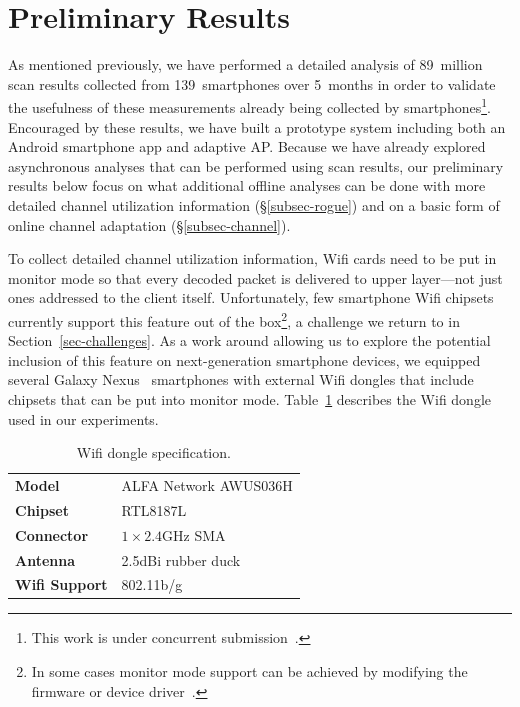 \section{Preliminary Results}
\label{sec-results}

As mentioned previously, we have performed a detailed analysis of 89~million
scan results collected from 139~smartphones over 5~months in order to
validate the usefulness of these measurements already being collected by
smartphones\footnote{This work is under concurrent
submission~\cite{conext14-pocketsniffer}.}. Encouraged by these results, we
have built a prototype \PS{} system including both an Android smartphone app
and adaptive AP. Because we have already explored asynchronous analyses that
can be performed using scan results, our preliminary results below focus on
what additional offline analyses can be done with more detailed channel
utilization information (\S\ref{subsec-rogue}) and on a basic form of online
channel adaptation (\S\ref{subsec-channel}).

To collect detailed channel utilization information, Wifi cards need to be
put in monitor mode so that every decoded packet is delivered to upper
layer---not just ones addressed to the client itself. Unfortunately, few
smartphone Wifi chipsets currently support this feature out of the
box\footnote{In some cases monitor mode support can be achieved by modifying
the firmware or device driver~\cite{bcmon}.}, a challenge we return to in
Section~\ref{sec-challenges}. As a work around allowing us to explore the
potential inclusion of this feature on next-generation smartphone devices, we
equipped several Galaxy Nexus~\cite{galaxynexus} smartphones with external
Wifi dongles that include chipsets that can be put into monitor mode.
Table~\ref{tab:dongle} describes the Wifi dongle used in our experiments.

\begin{table}[t!]
  \centering
  \begin{tabular}{ll}
    \toprule
    \textbf{Model} & ALFA Network AWUS036H \\
    \textbf{Chipset} & RTL8187L \\
    \textbf{Connector} & $1\times2.4$GHz SMA \\
    \textbf{Antenna} & 2.5dBi rubber duck \\
    \textbf{Wifi Support} & 802.11b/g \\
    \bottomrule
  \end{tabular}
  \caption{Wifi dongle specification.}
  \label{tab:dongle}
  \vspace*{-0.1in}
\end{table}


